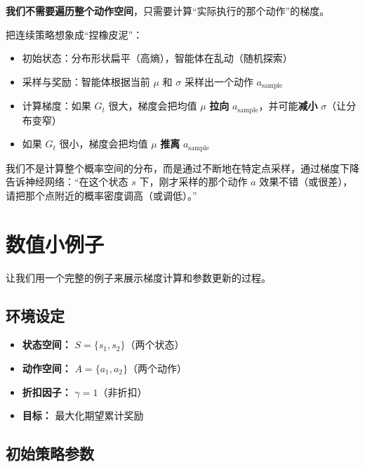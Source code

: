 \documentclass[12pt,a4paper]{article}
\theoremstyle{noteplain}
\theoremstyle{noteexercise}
\begin{document}
\textbf{我们不需要遍历整个动作空间}，只需要计算``实际执行的那个动作''的梯度。

把连续策略想象成``捏橡皮泥''：
\begin{itemize}
  \setlength{\itemsep}{0.2em}
  \item 初始状态：分布形状扁平（高熵），智能体在乱动（随机探索）
  \item 采样与奖励：智能体根据当前 $\mu$ 和 $\sigma$ 采样出一个动作 $a_\text{sample}$
  \item 计算梯度：如果 $G_t$ 很大，梯度会把均值 $\mu$ \textbf{拉向} $a_\text{sample}$，并可能\textbf{减小} $\sigma$（让分布变窄）
  \item 如果 $G_t$ 很小，梯度会把均值 $\mu$ \textbf{推离} $a_\text{sample}$
\end{itemize}

\begin{keypoint}[核心结论]
  我们不是计算整个概率空间的分布，而是通过不断地在特定点采样，通过梯度下降告诉神经网络：``在这个状态 $s$ 下，刚才采样的那个动作 $a$ 效果不错（或很差），请把那个点附近的概率密度调高（或调低）。''
\end{keypoint}

\section{数值小例子}\label{sec:numerical}

让我们用一个完整的例子来展示梯度计算和参数更新的过程。

\subsection{环境设定}\label{ssec:env}

\begin{itemize}
  \setlength{\itemsep}{0.2em}
  \item \textbf{状态空间：} $S = \{s_1, s_2\}$（两个状态）
  \item \textbf{动作空间：} $A = \{a_1, a_2\}$（两个动作）
  \item \textbf{折扣因子：} $\gamma = 1$（非折扣）
  \item \textbf{目标：} 最大化期望累计奖励
\end{itemize}

\subsection{初始策略参数}\label{ssec:init}
\end{document}
